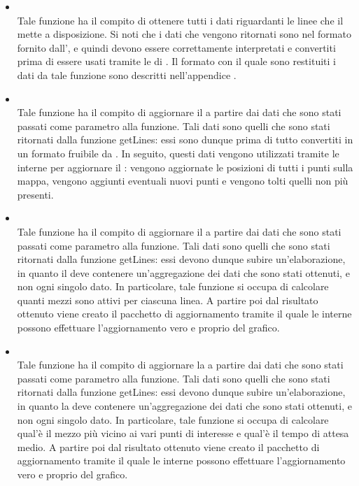 \begin{itemize}
            \item {} \\
            Tale funzione ha il compito di ottenere tutti i dati riguardanti le linee che il   mette a disposizione. Si noti che i dati che vengono ritornati sono nel formato fornito dall', e quindi devono essere correttamente interpretati e convertiti prima di essere usati tramite le  di . Il formato con il quale sono restituiti i dati da tale funzione sono descritti nell'appendice .
            
            \item {} \\
            Tale funzione ha il compito di aggiornare il  a partire dai dati che sono stati passati come parametro alla funzione. Tali dati sono quelli che sono stati ritornati dalla funzione getLines: essi sono dunque prima di tutto convertiti in un formato fruibile da . In seguito, questi dati vengono utilizzati tramite le  interne per aggiornare il : vengono aggiornate le posizioni di tutti i punti sulla mappa, vengono aggiunti eventuali nuovi punti e vengono tolti quelli non più presenti.
            
            \item {} \\
            Tale funzione ha il compito di aggiornare il  a partire dai dati che sono stati passati come parametro alla funzione. Tali dati sono quelli che sono stati ritornati dalla funzione getLines: essi devono dunque subire un'elaborazione, in quanto il  deve contenere un'aggregazione dei dati che sono stati ottenuti, e non ogni singolo dato. In particolare, tale funzione si occupa di calcolare quanti mezzi sono attivi per ciascuna linea. A partire poi dal risultato ottenuto viene creato il pacchetto di aggiornamento tramite il quale le  interne possono effettuare l'aggiornamento vero e proprio del grafico.
            
            \item {} \\
            Tale funzione ha il compito di aggiornare la  a partire dai dati che sono stati passati come parametro alla funzione. Tali dati sono quelli che sono stati ritornati dalla funzione getLines: essi devono dunque subire un'elaborazione, in quanto la  deve contenere un'aggregazione dei dati che sono stati ottenuti, e non ogni singolo dato. In particolare, tale funzione si occupa di calcolare qual'è il mezzo più vicino ai vari punti di interesse e qual'è il tempo di attesa medio. A partire poi dal risultato ottenuto viene creato il pacchetto di aggiornamento tramite il quale le  interne possono effettuare l'aggiornamento vero e proprio del grafico.

        \end{itemize}
